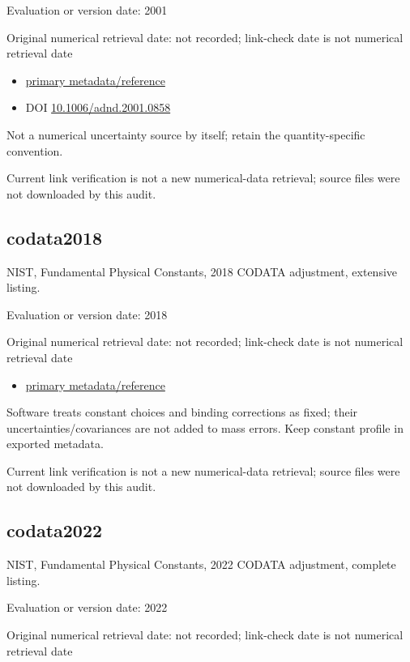 \documentclass[
  11pt,
  letterpaper,
]{article}
\providecommand{\tightlist}{%
  \setlength{\itemsep}{0pt}\setlength{\parskip}{0pt}}
\begin{document}
Evaluation or version date: 2001

Original numerical retrieval date: not recorded; link-check date is not
numerical retrieval date

\begin{itemize}
\tightlist
\item
  \href{https://www.nndc.bnl.gov/be2/}{primary metadata/reference}
\item
  DOI
  \href{https://doi.org/10.1006/adnd.2001.0858}{10.1006/adnd.2001.0858}
\end{itemize}

Not a numerical uncertainty source by itself; retain the
quantity-specific convention.

Current link verification is not a new numerical-data retrieval; source
files were not downloaded by this audit.

\subsection{codata2018}\label{codata2018}

NIST, Fundamental Physical Constants, 2018 CODATA adjustment, extensive
listing.

Evaluation or version date: 2018

Original numerical retrieval date: not recorded; link-check date is not
numerical retrieval date

\begin{itemize}
\tightlist
\item
  \href{https://physics.nist.gov/cuu/pdf/all_2018.pdf}{primary
  metadata/reference}
\end{itemize}

Software treats constant choices and binding corrections as fixed; their
uncertainties/covariances are not added to mass errors. Keep constant
profile in exported metadata.

Current link verification is not a new numerical-data retrieval; source
files were not downloaded by this audit.

\subsection{codata2022}\label{codata2022}

NIST, Fundamental Physical Constants, 2022 CODATA adjustment, complete
listing.

Evaluation or version date: 2022

Original numerical retrieval date: not recorded; link-check date is not
numerical retrieval date
\end{document}
